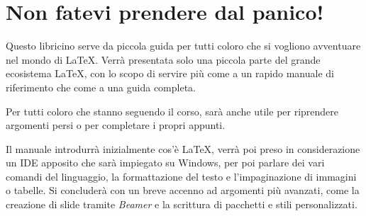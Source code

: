 \chapter*{Non fatevi prendere dal panico!}

Questo libricino serve da piccola guida per tutti coloro che si vogliono 
avventuare nel mondo di \LaTeX. Verrà presentata solo una piccola parte del 
grande ecosistema \LaTeX, con lo scopo di servire più come a un rapido manuale 
di riferimento che come a una guida completa.

Per tutti coloro che stanno seguendo il corso, sarà anche utile per riprendere 
argomenti persi o per completare i propri appunti.

Il manuale introdurrà inizialmente cos'è \LaTeX, verrà poi preso in 
considerazione un IDE apposito che sarà impiegato su Windows, per poi parlare 
dei vari comandi del linguaggio, la formattazione del testo e l'impaginazione 
di immagini o tabelle. Si concluderà con un breve accenno ad argomenti più 
avanzati, come la creazione di slide tramite \textit{Beamer} e la scrittura di 
pacchetti e stili personalizzati.